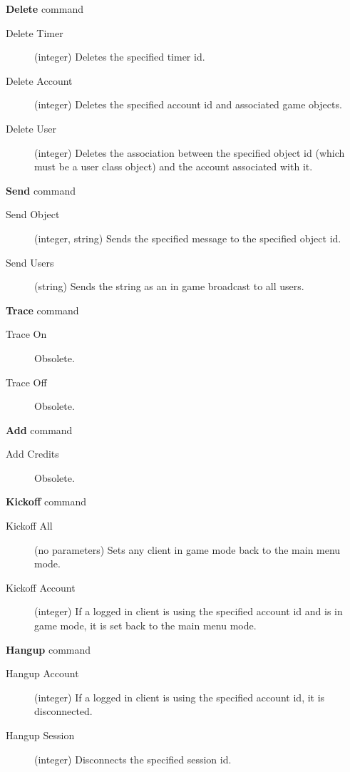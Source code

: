 \textbf{Delete} command
\begin{description}
\item[Delete Timer] (integer) Deletes the specified timer id.
\item[Delete Account] (integer) Deletes the specified account id and associated
game objects.
\item[Delete User] (integer) Deletes the association between the specified object 
id (which must be a user class object) and the account associated with it.
\end{description}

\textbf{Send} command
\begin{description}
\item[Send Object] (integer, string) Sends the specified message to the specified
object id.
\item[Send Users] (string) Sends the string as an in game broadcast to all users.
\end{description}

\textbf{Trace} command
\begin{description}
\item[Trace On] Obsolete.
\item[Trace Off] Obsolete.
\end{description}

\textbf{Add} command
\begin{description}
\item[Add Credits] Obsolete.
\end{description}

\textbf{Kickoff} command
\begin{description}
\item[Kickoff All] (no parameters) Sets any client in game mode back to the
main menu mode.
\item[Kickoff Account] (integer) If a logged in client is using the specified account
id and is in game mode, it is set back to the main menu mode.
\end{description}

\textbf{Hangup} command
\begin{description}
\item[Hangup Account] (integer) If a logged in client is using the specified account id,
it is disconnected.
\item[Hangup Session] (integer) Disconnects the specified session id.
\end{description}

